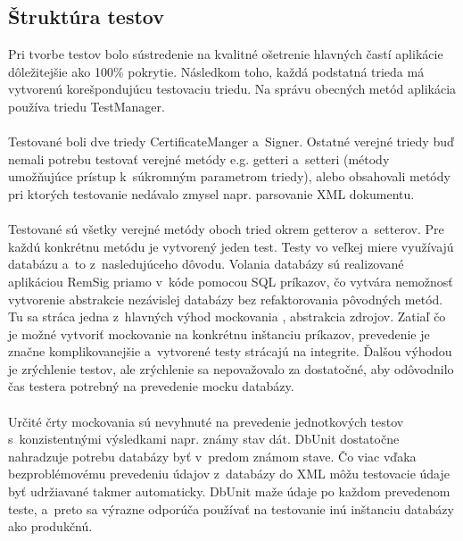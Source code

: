 \documentclass[
  digital, %
  table,   %
oneside,
  nolof,     %
  nolot,     %
]{fithesis3}
\begin{document}
\subsection{Štruktúra testov}
Pri tvorbe testov bolo sústredenie na kvalitné ošetrenie hlavných častí aplikácie dôležitejšie ako 100\% pokrytie. Následkom toho, každá podstatná trieda má vytvorenú korešpondujúcu testovaciu triedu. Na správu obecných metód aplikácia používa triedu TestManager. \paragraph{}
Testované boli dve triedy CertificateManger a~Signer. Ostatné verejné triedy buď nemali potrebu testovať verejné metódy e.g. getteri a~setteri (métody umožňujúce prístup k~súkromným parametrom triedy), alebo obsahovali metódy pri ktorých testovanie nedávalo zmysel napr. parsovanie XML dokumentu. \paragraph{}
Testované sú všetky verejné metódy oboch tried okrem getterov a~setterov. Pre každú konkrétnu metódu je vytvorený jeden test. Testy vo veľkej miere využívajú databázu a~to z~nasledujúceho dôvodu. Volania databázy sú realizované aplikáciou RemSig priamo v~kóde pomocou SQL príkazov, čo vytvára nemožnosť vytvorenie abstrakcie nezávislej databázy bez refaktorovania pôvodných metód. Tu sa stráca jedna z~hlavných výhod mockovania \cite{mocking}, abstrakcia zdrojov. Zatiaľ čo je možné vytvoriť mockovanie na konkrétnu inštanciu príkazov, prevedenie je značne komplikovanejšie a~vytvorené testy strácajú na integrite. Ďalšou výhodou je zrýchlenie testov, ale zrýchlenie sa nepovažovalo za dostatočné, aby odôvodnilo čas testera potrebný na prevedenie mocku databázy. \paragraph{}
Určité črty mockovania sú nevyhnuté na prevedenie jednotkových testov s~konzistentnými výsledkami napr. známy stav dát. DbUnit dostatočne nahradzuje potrebu  databázy byť v~predom známom stave. Čo viac vďaka bezproblémovému prevedeniu údajov z~databázy do XML môžu testovacie údaje byť udržiavané takmer automaticky. DbUnit maže údaje po každom prevedenom teste, a~preto sa výrazne odporúča používať na testovanie inú inštanciu databázy ako produkčnú. \paragraph{}
\end{document}
